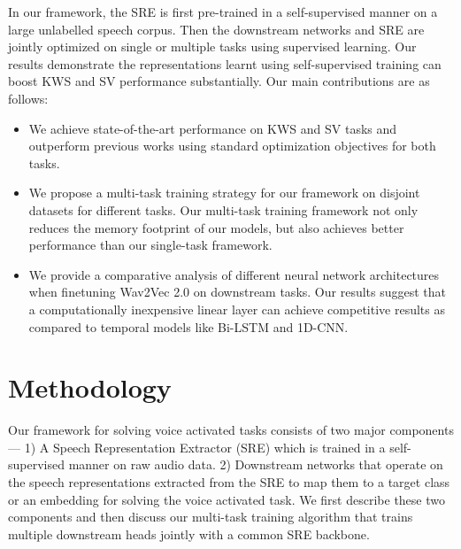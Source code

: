 \documentclass{article}
\begin{document}
In our framework, the SRE is first pre-trained in a self-supervised manner on a large unlabelled speech corpus. Then the downstream networks and SRE are jointly optimized on single or multiple tasks using supervised learning. Our results demonstrate the representations learnt using self-supervised training can boost KWS and SV performance substantially. Our main contributions are as follows:
\begin{itemize}
\itemsep0em 

    \item We achieve state-of-the-art performance on KWS and SV tasks and outperform previous works using standard optimization objectives for both tasks. 
    \item We propose a multi-task training strategy for our framework on disjoint datasets for different tasks.
    Our multi-task training framework not only reduces the memory footprint of our models, but also achieves better performance than our single-task framework.
    \item We provide a comparative analysis of different neural network architectures when finetuning Wav2Vec 2.0 on downstream tasks. Our results suggest that a computationally inexpensive linear layer can achieve competitive results as compared to temporal models like Bi-LSTM and 1D-CNN.
\end{itemize}




\section{Methodology}
\label{sec:method}

Our framework for solving voice activated tasks consists of two major components --- 1) A Speech Representation Extractor (SRE) which is trained in a self-supervised manner on raw audio data. 2) Downstream networks that operate on the speech representations extracted from the SRE to map them to a target class or an embedding for solving the voice activated task. We first describe these two components and then discuss our multi-task training algorithm that trains multiple downstream heads jointly with a common SRE backbone. 
\end{document}
